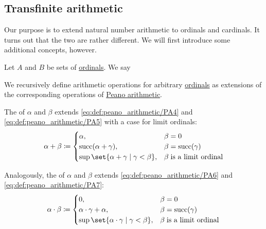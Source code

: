 \subsection{Transfinite arithmetic}\label{subsec:ordinal_and_cardinal_arithmetic}

Our purpose is to extend natural number arithmetic to ordinals and cardinals. It turns out that the two are rather different. We will first introduce some additional concepts, however.

\begin{definition}
  Let \( A \) and \( B \) be sets of \hyperref[def:ordinal]{ordinals}. We say
\end{definition}

\begin{definition}\label{def:ordinal_arithmetic}
  We recursively define arithmetic operations for arbitrary \hyperref[def:ordinal]{ordinals} as extensions of the corresponding operations of \hyperref[def:peano_arithmetic]{Peano arithmetic}.

  \begin{thmenum}
     The  of \( \alpha \) and \( \beta \) extends \eqref{eq:def:peano_arithmetic/PA4} and \eqref{eq:def:peano_arithmetic/PA5} with a case for limit ordinals:
    \begin{equation}\label{eq:def:ordinal_arithmetic/sum}
      \alpha + \beta \coloneqq \begin{cases}
        \alpha,                                            &\beta = 0 \\
        \op{succ}(\alpha + \gamma),                        &\beta = \op{succ}(\gamma)\\
        \sup\set{ \alpha + \gamma \given \gamma < \beta }, &\beta \T{is a limit ordinal}\\
      \end{cases}
    \end{equation}

     Analogously, the  of \( \alpha \) and \( \beta \) extends \eqref{eq:def:peano_arithmetic/PA6} and \eqref{eq:def:peano_arithmetic/PA7}:
    \begin{equation}\label{eq:def:ordinal_arithmetic/product}
      \alpha \cdot \beta \coloneqq \begin{cases}
        0,                                                     &\beta = 0 \\
        \alpha \cdot \gamma + \alpha,                          &\beta = \op{succ}(\gamma)\\
        \sup\set{ \alpha \cdot \gamma \given \gamma < \beta }, &\beta \T{is a limit ordinal}\\
      \end{cases}
    \end{equation}


\end{thmenum}
\end{definition}
